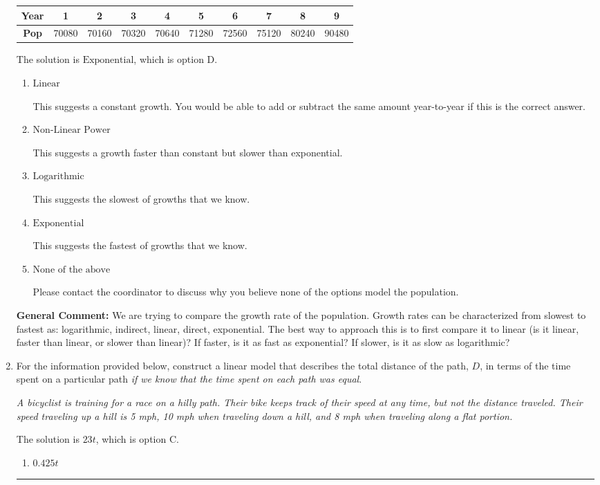 \documentclass{extbook}[14pt]
\newcommand{\litem}[1]{\item #1

\rule{\textwidth}{0.4pt}}
\begin{document}
\begin{enumerate}
{\begin{tabular}{c|c|c|c|c|c|c|c|c|c}
\textbf{Year} &1 &2 &3 &4 &5 &6 &7 &8 &9\tabularnewline \hline
\textbf{Pop} &70080 &70160 &70320 &70640 &71280 &72560 &75120 &80240 &90480\end{tabular}The solution is \( \text{Exponential} \), which is option D.\begin{enumerate}[label=\Alph*.]
\item \( \text{Linear} \)

This suggests a constant growth. You would be able to add or subtract the same amount year-to-year if this is the correct answer.
\item \( \text{Non-Linear Power} \)

This suggests a growth faster than constant but slower than exponential.
\item \( \text{Logarithmic} \)

This suggests the slowest of growths that we know.
\item \( \text{Exponential} \)

This suggests the fastest of growths that we know.
\item \( \text{None of the above} \)

Please contact the coordinator to discuss why you believe none of the options model the population.
\end{enumerate}

\textbf{General Comment:} We are trying to compare the growth rate of the population. Growth rates can be characterized from slowest to fastest as: logarithmic, indirect, linear, direct, exponential. The best way to approach this is to first compare it to linear (is it linear, faster than linear, or slower than linear)? If faster, is it as fast as exponential? If slower, is it as slow as logarithmic?
}
\litem{
For the information provided below, construct a linear model that describes the total distance of the path, $D$, in terms of the time spent on a particular path \textit{if we know that the time spent on each path was equal}.

\begin{center}
    \textit{ A bicyclist is training for a race on a hilly path. Their bike keeps track of their speed at any time, but not the distance traveled. Their speed traveling up a hill is 5 mph, 10 mph when traveling down a hill, and 8 mph when traveling along a flat portion. }
\end{center}
The solution is \( 23 t \), which is option C.\begin{enumerate}[label=\Alph*.]
\item \( 0.425 t \)


\end{enumerate}}
\end{enumerate}
\end{document}
